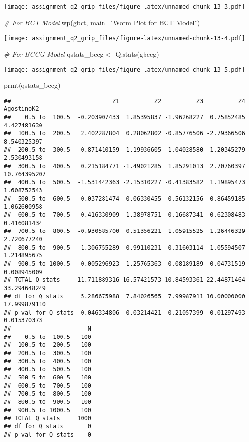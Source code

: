 \documentclass[
]{article}
\newenvironment{Shaded}{\begin{snugshade}}{\end{snugshade}}
\newcommand{\AttributeTok}[1]{\textcolor[rgb]{0.77,0.63,0.00}{#1}}
\newcommand{\CommentTok}[1]{\textcolor[rgb]{0.56,0.35,0.01}{\textit{#1}}}
\newcommand{\FunctionTok}[1]{\textcolor[rgb]{0.00,0.00,0.00}{#1}}
\newcommand{\NormalTok}[1]{#1}
\newcommand{\OtherTok}[1]{\textcolor[rgb]{0.56,0.35,0.01}{#1}}
\newcommand{\StringTok}[1]{\textcolor[rgb]{0.31,0.60,0.02}{#1}}
\begin{document}
\texttt{[image: assignment\_q2\_grip\_files/figure-latex/unnamed-chunk-13-3.pdf]}

\begin{Shaded}
\begin{Highlighting}[]
\CommentTok{\# For BCT Model}
\FunctionTok{wp}\NormalTok{(gbct, }\AttributeTok{main=}\StringTok{"Worm Plot for BCT Model"}\NormalTok{)}
\end{Highlighting}
\end{Shaded}

\texttt{[image: assignment\_q2\_grip\_files/figure-latex/unnamed-chunk-13-4.pdf]}

\begin{Shaded}
\begin{Highlighting}[]
\CommentTok{\# For BCCG Model}
\NormalTok{qstats\_bccg }\OtherTok{\textless{}{-}} \FunctionTok{Q.stats}\NormalTok{(gbccg)}
\end{Highlighting}
\end{Shaded}

\texttt{[image: assignment\_q2\_grip\_files/figure-latex/unnamed-chunk-13-5.pdf]}

\begin{Shaded}
\begin{Highlighting}[]
\FunctionTok{print}\NormalTok{(qstats\_bccg)}
\end{Highlighting}
\end{Shaded}

\begin{verbatim}
##                             Z1          Z2          Z3          Z4   AgostinoK2
##    0.5 to  100.5  -0.203907433  1.85395837 -1.96268227  0.75852485  4.427481630
##  100.5 to  200.5   2.402287804  0.28062802 -0.85776506 -2.79366506  8.540325397
##  200.5 to  300.5   0.871410159 -1.19936605  1.04028580  1.20345279  2.530493158
##  300.5 to  400.5   0.215184771 -1.49021285  1.85291013  2.70760397 10.764395207
##  400.5 to  500.5  -1.531442363 -2.15310227 -0.41383582  1.19895473  1.608752543
##  500.5 to  600.5   0.037281474 -0.06330455  0.56132156  0.86459185  1.062600958
##  600.5 to  700.5   0.416330909  1.38978751 -0.16687341  0.62308483  0.416081434
##  700.5 to  800.5  -0.930585700  0.51356221  1.05915525  1.26446329  2.720677240
##  800.5 to  900.5  -1.306755289  0.99110231  0.31603114  1.05594507  1.214895675
##  900.5 to 1000.5  -0.005296923 -1.25765363  0.08189189 -0.04731519  0.008945009
## TOTAL Q stats     11.711889316 16.57421573 10.84593361 22.44871464 33.294648249
## df for Q stats     5.286675988  7.84026565  7.99987911 10.00000000 17.999879110
## p-val for Q stats  0.046334806  0.03214421  0.21057399  0.01297493  0.015370373
##                      N
##    0.5 to  100.5   100
##  100.5 to  200.5   100
##  200.5 to  300.5   100
##  300.5 to  400.5   100
##  400.5 to  500.5   100
##  500.5 to  600.5   100
##  600.5 to  700.5   100
##  700.5 to  800.5   100
##  800.5 to  900.5   100
##  900.5 to 1000.5   100
## TOTAL Q stats     1000
## df for Q stats       0
## p-val for Q stats    0
\end{verbatim}
\end{document}
